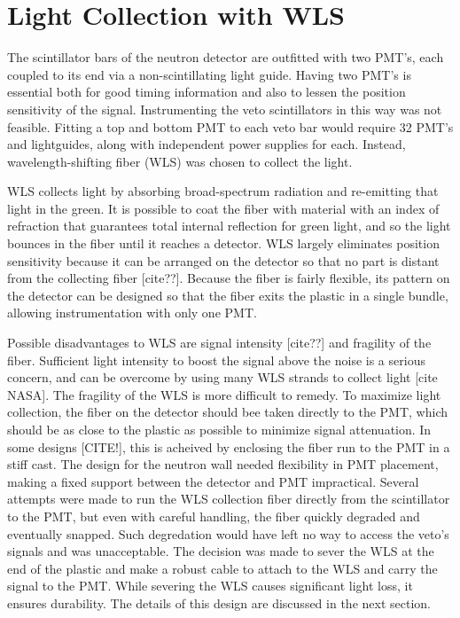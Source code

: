 \section{Light Collection with WLS}

The scintillator bars of the neutron detector are outfitted with two PMT's, each coupled to its end via a non-scintillating light guide.  Having two PMT's is essential both for good timing information and also to lessen the position sensitivity of the signal.  Instrumenting the veto scintillators in this way was not feasible.  Fitting a top and bottom PMT to each veto bar would require 32 PMT's and lightguides, along with independent power supplies for each.  Instead, wavelength-shifting fiber (WLS) was chosen to collect the light.

WLS collects light by absorbing broad-spectrum radiation and re-emitting that light in the green.  It is possible to coat the fiber with material with an index of refraction that guarantees total internal reflection for green light, and so the light bounces in the fiber until it reaches a detector.  WLS largely eliminates position sensitivity because it can be arranged on the detector so that no part is distant from the collecting fiber [cite??].  Because the fiber is fairly flexible, its pattern on the detector can be designed so that the fiber exits the plastic in a single bundle, allowing instrumentation with only one PMT.

Possible disadvantages to WLS are signal intensity [cite??] and fragility of the fiber.  Sufficient light intensity to boost the signal above the noise is a serious concern, and can be overcome by using many WLS strands to collect light [cite NASA].  The fragility of the WLS is more difficult to remedy.  To maximize light collection, the fiber on the detector should bee taken directly to the PMT, which should be as close to the plastic as possible to minimize signal attenuation.  In some designs [CITE!], this is acheived by enclosing the fiber run to the PMT in a stiff cast.  The design for the neutron wall needed flexibility in PMT placement, making a fixed support between the detector and PMT impractical.  Several attempts were made to run the WLS collection fiber directly from the scintillator to the PMT, but even with careful handling, the fiber quickly degraded and eventually snapped.  Such degredation would have left no way to access the veto's signals and was unacceptable.  The decision was made to sever the WLS at the end of the plastic and make a robust cable to attach to the WLS and carry the signal to the PMT.  While severing the WLS causes significant light loss, it ensures durability.  The details of this design are discussed in the next section.  

